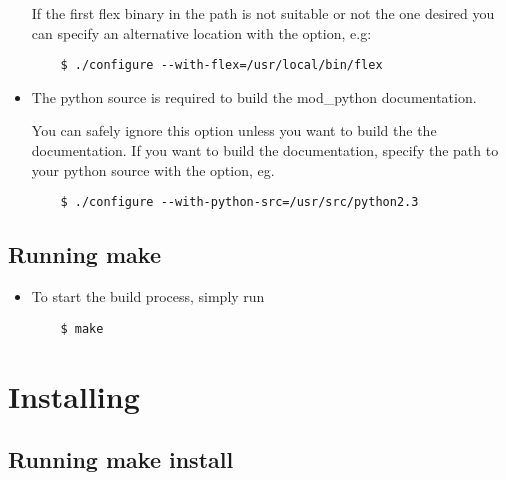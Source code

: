 \begin{itemize}
  If the first flex binary in the path is not suitable or not the one desired
  you can specify an alternative location with the 
  option, e.g:
 
  \begin{verbatim}
    $ ./configure --with-flex=/usr/local/bin/flex
  \end{verbatim}

\item
  The python source is required to build the mod_python documentation.

  You can safely ignore this option unless you want to build the the
  documentation. If you want to build the documentation, specify the path
  to your python source with the  option, eg.

  \begin{verbatim}
    $ ./configure --with-python-src=/usr/src/python2.3
  \end{verbatim}                      

\end{itemize}

\subsection{Running make\label{inst-make}}

\begin{itemize}

\item
  To start the build process, simply run
  \begin{verbatim}
    $ make
  \end{verbatim}

\end{itemize}

\section{Installing\label{inst-installing}}

\subsection{Running make install\label{inst-makeinstall}}

